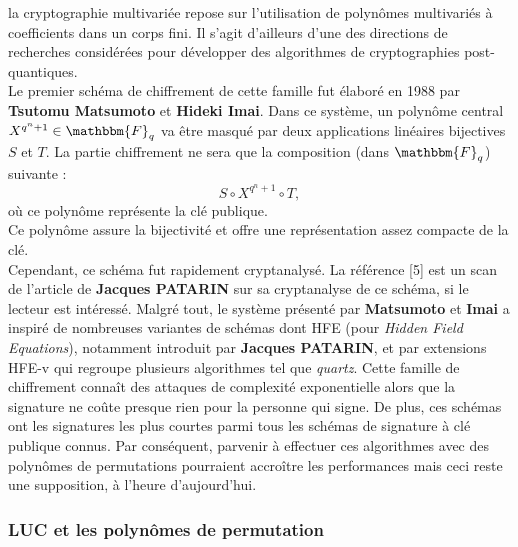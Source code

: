 \documentclass[12pt]{article}
\theoremstyle{remark}\newtheorem{note}{Note}
\theoremstyle{remark}\newtheorem{nota}{Notation}
\newcommand{\Fq}{\mathbbm{F}_q}
\theoremstyle{definition}
\begin{document}
la cryptographie multivariée repose sur l'utilisation de polynômes multivariés à coefficients dans un corps fini. Il s'agit d'ailleurs d'une des directions de recherches considérées pour développer des algorithmes de cryptographies post-quantiques.\\
Le premier schéma de chiffrement de cette famille fut élaboré en 1988 par \textbf{Tsutomu Matsumoto} et \textbf{Hideki Imai}. Dans ce système, un polynôme central $X^{q^n+1} \in \Fq$ va être masqué par deux applications linéaires bijectives $S$ et $T$. La partie chiffrement ne sera que la composition (dans $\Fq$) suivante : $$S\circ X^{q^n+1} \circ T,$$
où ce polynôme représente la clé publique.\\
Ce polynôme assure la bijectivité et offre une représentation assez compacte de la clé. \vspace{12pt} \\
Cependant, ce schéma fut rapidement cryptanalysé. La référence [5] est un scan de l'article de \textbf{Jacques PATARIN} sur sa cryptanalyse de ce schéma, si le lecteur est intéressé. Malgré tout, le système présenté par \textbf{Matsumoto} et \textbf{Imai} a inspiré de nombreuses variantes de schémas dont \textsf{HFE} (pour \textit{Hidden Field Equations}), notamment introduit par \textbf{Jacques PATARIN}, et par extensions %
\textsf{HFE-v} qui regroupe plusieurs algorithmes tel que \textit{quartz}. Cette famille de chiffrement connaît des attaques de complexité exponentielle alors que la signature ne coûte presque rien pour la personne qui signe. De plus, ces schémas ont les signatures les plus courtes parmi tous les schémas de signature à clé publique connus. Par conséquent, parvenir à effectuer ces algorithmes avec des polynômes de permutations pourraient accroître les performances mais ceci reste une supposition, à l'heure d'aujourd'hui.\\

\subsubsection{LUC et les polynômes de permutation}
\end{document}
